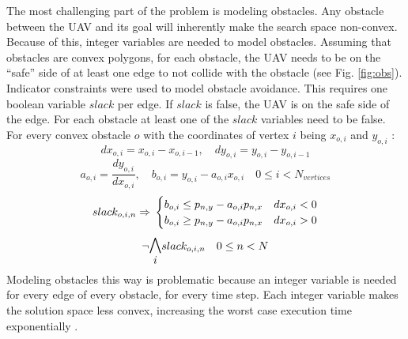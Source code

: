 The most challenging part of the problem is modeling obstacles. Any obstacle between the UAV and its goal will inherently make the search space non-convex. Because of this, integer variables are needed to model obstacles. 
Assuming that obstacles are convex polygons, for each obstacle, the UAV needs to be on the ``safe'' side of at least one edge to not collide with the obstacle (see Fig. \ref{fig:obs}). 
Indicator constraints were used to model obstacle avoidance. This requires one boolean variable $slack$ per edge. If $slack$ is false, the UAV is on the safe side of the edge. For each obstacle at least one of the $slack$ variables need to be false. For every convex obstacle $o$ with the coordinates of vertex $i$ being $x_{o,i}$ and $y_{o,i}$ \cite{Bellingham2002}:
\begin{equation*}
dx_{o,i} = x_{o,i} - x_{o,i-1}, \quad dy_{o,i} = y_{o,i} - y_{o,i-1} 
\end{equation*}
\begin{equation*}
\label{eq:lin-a}
a_{o,i} = \dfrac{dy_{o,i}}{dx_{o,i}}, \quad b_{o,i} = y_{o,i} - a_{o,i} x_{o,i} \quad 0 \leq i < N_{vertices}
\end{equation*}
\begin{equation}
\label{eq:obs}
slack_{o,i,n} \Rightarrow \\
\begin{cases}
b_{o,i} \leq p_{n,y} - a_{o,i} p_{n,x} & dx_{o,i} < 0 \\
b_{o,i} \geq p_{n,y} - a_{o,i} p_{n,x} & dx_{o,i} > 0 \\
\end{cases}
\end{equation}
\begin{equation}
\neg \mathlarger{\mathlarger{\bigwedge_{i}}} slack_{o,i,n} \quad 0 \leq n < N
\end{equation}
Modeling obstacles this way is problematic because an integer variable is needed for every edge of every obstacle, for every time step. Each integer variable makes the solution space less convex, increasing the worst case execution time exponentially \cite{DBLP:conf/coco/Karp72}.